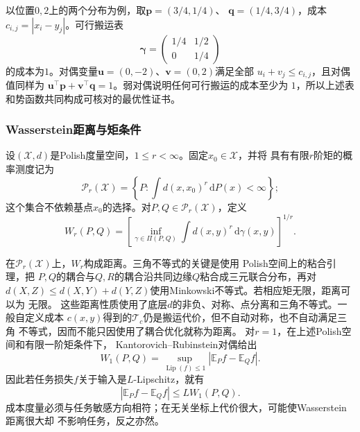 以位置\(0,2\)上的两个分布为例，取\(\bm p=(3/4,1/4)\)、
\(\bm q=(1/4,3/4)\)，成本\(c_{i,j}=|x_i-y_j|\)。可行搬运表
\[
  \bm{\gamma}
  =
  \begin{pmatrix}
    1/4 & 1/2\\
    0   & 1/4
  \end{pmatrix}
\]
的成本为\(1\)。对偶变量\(\bm u=(0,-2)\)、\(\bm v=(0,2)\)满足全部
\(u_i+v_j\leq c_{i,j}\)，且对偶值同样为
\(\bm u^{\top}\bm p+\bm v^{\top}\bm q=1\)。弱对偶说明任何可行搬运的成本至少为
\(1\)，所以上述表和势函数共同构成可核对的最优性证书。
\subsubsection{Wasserstein距离与矩条件}
\begin{definition}[Wasserstein距离]
  \label{def:information-wasserstein-distance}
设\((\mathcal{X},d)\)是Polish度量空间，\(1\leq r<\infty\)。固定\(x_0\in\mathcal X\)，并将
具有有限\(r\)阶矩的概率测度记为
\[
  \mathcal P_r(\mathcal X)
  =
  \left\{
    P:\int d(x,x_0)^r\,\mathrm{d}P(x)<\infty
  \right\};
\]
这个集合不依赖基点\(x_0\)的选择。对\(P,Q\in\mathcal P_r(\mathcal X)\)，定义
\begin{equation}
  W_r(P,Q)
  =
  \left[
    \inf_{\gamma\in\Pi(P,Q)}
    \int d(x,y)^r\,\mathrm{d}\gamma(x,y)
  \right]^{1/r}.
  \label{eq:information-wasserstein-distance}
\end{equation}
\end{definition}
在\(\mathcal P_r(\mathcal X)\)上，\(W_r\)构成距离。三角不等式的关键是使用
Polish空间上的粘合引理，把
\(P,Q\)的耦合与\(Q,R\)的耦合沿共同边缘\(Q\)粘合成三元联合分布，再对
\(d(X,Z)\leq d(X,Y)+d(Y,Z)\)使用Minkowski不等式。若相应矩无限，距离可以为
无限。
这些距离性质使用了底层\(d\)的非负、对称、点分离和三角不等式。一般自定义成本
\(c(x,y)\)得到的\(\mathcal T_c\)仍是搬运代价，但不自动对称，也不自动满足三角
不等式，因而不能只因使用了耦合优化就称为距离。
对\(r=1\)，在上述Polish空间和有限一阶矩条件下，
Kantorovich--Rubinstein对偶给出
\begin{equation}
  W_1(P,Q)
  =
  \sup_{\operatorname{Lip}(f)\leq1}
  |\mathbb{E}_P f-\mathbb{E}_Q f|.
  \label{eq:information-kr-duality}
\end{equation}
因此若任务损失\(f\)关于输入是\(L\)-Lipschitz，就有
\[
  |\mathbb{E}_P f-\mathbb{E}_Q f|
  \leq
  L W_1(P,Q).
\]
成本度量必须与任务敏感方向相符；在无关坐标上代价很大，可能使Wasserstein距离很大却
不影响任务，反之亦然。
